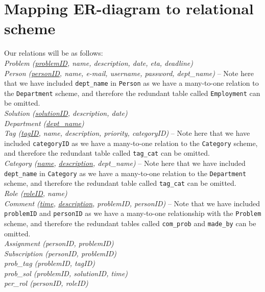 \section{Mapping ER-diagram to relational scheme}
\label{sec:map_er_rel}

Our relations will be as follows:\\

\noindent\textit{Problem (\underline{problemID}, name, description, date, eta, deadline)} \\

\noindent\textit{Person (\underline{personID}, name, e-mail, username, password, dept\_name)}  -- Note here that we have included \verb+dept_name+ in \verb+Person+ as we have a many-to-one relation to the \verb+Department+ scheme, and therefore the redundant table called \verb+Employment+ can be omitted.\\

\noindent\textit{Solution (\underline{solutionID}, description, date)} \\

\noindent\textit{Department (\underline{dept\_name})} \\

\noindent\textit{Tag (\underline{tagID}, name, description, priority, categoryID)} -- Note here that we have included \verb+categoryID+ as we have a many-to-one relation to the \verb+Category+ scheme, and therefore the redundant table called \verb+tag_cat+ can be omitted.\\

\noindent\textit{Category (\underline{name}, \underline{description}, dept\_name)} -- Note here that we have included \verb+dept_name+ in \verb+Category+ as we have a many-to-one relation to the \verb+Department+ scheme, and therefore the redundant table called \verb+tag_cat+ can be omitted.\\

\noindent\textit{Role (\underline{roleID}, name)} \\

\noindent\textit{Comment (\underline{time}, \underline{description}, problemID, personID)} -- Note that we have included \verb+problemID+ and \verb+personID+ as we have a many-to-one relationship with the \verb+Problem+ scheme, and therefore the redundant tables called \verb+com_prob+ and \verb+made_by+ can be omitted.\\

\noindent\textit{Assignment (personID, problemID)} \\

\noindent\textit{Subscription (personID, problemID)} \\

\noindent\textit{prob\_tag (problemID, tagID)} \\

\noindent\textit{prob\_sol (problemID, solutionID, time)} \\

\noindent\textit{per\_rol (personID, roleID)} \\